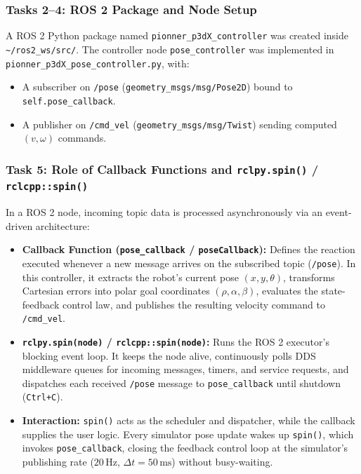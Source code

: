 \documentclass[11pt,a4paper]{article}
\begin{document}
\subsubsection*{Tasks 2--4: ROS 2 Package and Node Setup}
A ROS 2 Python package named \texttt{pionner\_p3dX\_controller} was created inside \texttt{\textasciitilde/ros2\_ws/src/}. The controller node \texttt{pose\_controller} was implemented in \texttt{pionner\_p3dX\_pose\_controller.py}, with:
\begin{itemize}
  \item A subscriber on \texttt{/pose} (\texttt{geometry\_msgs/msg/Pose2D}) bound to \texttt{self.pose\_callback}.
  \item A publisher on \texttt{/cmd\_vel} (\texttt{geometry\_msgs/msg/Twist}) sending computed $(v, \omega)$ commands.
\end{itemize}

\subsubsection*{Task 5: Role of Callback Functions and \texttt{rclpy.spin()} / \texttt{rclcpp::spin()}}
In a ROS 2 node, incoming topic data is processed asynchronously via an event-driven architecture:
\begin{itemize}
  \item \textbf{Callback Function (\texttt{pose\_callback} / \texttt{poseCallback}):} Defines the reaction executed whenever a new message arrives on the subscribed topic (\texttt{/pose}). In this controller, it extracts the robot's current pose $(x, y, \theta)$, transforms Cartesian errors into polar goal coordinates $(\rho, \alpha, \beta)$, evaluates the state-feedback control law, and publishes the resulting velocity command to \texttt{/cmd\_vel}.
  \item \textbf{\texttt{rclpy.spin(node)} / \texttt{rclcpp::spin(node)}:} Runs the ROS 2 executor's blocking event loop. It keeps the node alive, continuously polls DDS middleware queues for incoming messages, timers, and service requests, and dispatches each received \texttt{/pose} message to \texttt{pose\_callback} until shutdown (\texttt{Ctrl+C}).
  \item \textbf{Interaction:} \texttt{spin()} acts as the scheduler and dispatcher, while the callback supplies the user logic. Every simulator pose update wakes up \texttt{spin()}, which invokes \texttt{pose\_callback}, closing the feedback control loop at the simulator's publishing rate ($20\,\text{Hz}$, $\Delta t = 50\,\text{ms}$) without busy-waiting.
\end{itemize}
\end{document}

